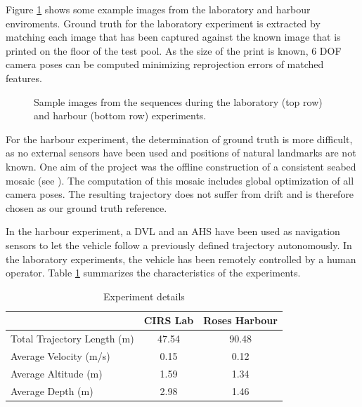 \documentclass[conference]{IEEEtran}
\begin{document}

Figure \ref{sample-images} shows some example images from the laboratory and harbour enviroments. Ground truth for the laboratory experiment is extracted by matching each image that has been captured against the known image that is printed on the floor of the test pool. As the size of the print is known, 6 DOF camera poses can be computed minimizing reprojection errors of matched features.

\begin{figure}
  \noindent{}
  \caption{Sample images from the sequences during the laboratory (top row) and harbour (bottom row) experiments.}
  \label{sample-images}
\end{figure}

For the harbour experiment, the determination of ground truth is more difficult, as no external sensors have been used and positions of natural landmarks are not known. One aim of the project was the offline construction of a consistent seabed mosaic (see \cite{Ferrer2007}). The computation of this mosaic includes global optimization of all camera poses. The resulting trajectory does not suffer from drift and is therefore chosen as our ground truth reference.

In the harbour experiment, a DVL and an AHS have been used as navigation sensors to let the vehicle follow a previously defined trajectory autonomously. In the laboratory experiments, the vehicle has been remotely controlled by a human operator. Table \ref{experiment-details} summarizes the characteristics of the experiments.

\begin{table}[!t]
  \renewcommand{\arraystretch}{1.3}
  \caption{Experiment details}
  \label{experiment-details}
  \centering
  \begin{tabular}{lcc}
    & \textbf{CIRS Lab} & \textbf{Roses Harbour}  \\ \hline
    Total Trajectory Length (m)     & 47.54 & 90.48  \\
    Average Velocity (m/s)          & 0.15 & 0.12  \\
    Average Altitude (m)            & 1.59 & 1.34  \\
    Average Depth (m)               & 2.98 & 1.46  \\
  \end{tabular}
\end{table}
\end{document}
